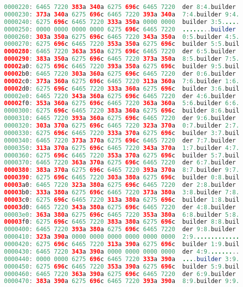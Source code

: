 \begin{lstlisting}[language=Java]
0000220: 6465 7220 383a 340a 6275 696c 6465 7220  der 8:4.builder
0000230: 373a 340a 6275 696c 6465 7220 393a 340a  7:4.builder 9:4.
0000240: 6275 696c 6465 7220 333a 350a 0000 0000  builder 3:5.....
0000250: 0000 0000 0000 0000 6275 696c 6465 7220  ........builder
0000260: 303a 350a 6275 696c 6465 7220 343a 350a  0:5.builder 4:5.
0000270: 6275 696c 6465 7220 353a 350a 6275 696c  builder 5:5.buil
0000280: 6465 7220 363a 350a 6275 696c 6465 7220  der 6:5.builder
0000290: 383a 350a 6275 696c 6465 7220 373a 350a  8:5.builder 7:5.
00002a0: 6275 696c 6465 7220 393a 350a 6275 696c  builder 9:5.buil
00002b0: 6465 7220 303a 360a 6275 696c 6465 7220  der 0:6.builder
00002c0: 373a 360a 6275 696c 6465 7220 313a 360a  7:6.builder 1:6.
00002d0: 6275 696c 6465 7220 333a 360a 6275 696c  builder 3:6.buil
00002e0: 6465 7220 343a 360a 6275 696c 6465 7220  der 4:6.builder
00002f0: 353a 360a 6275 696c 6465 7220 363a 360a  5:6.builder 6:6.
0000300: 6275 696c 6465 7220 383a 360a 6275 696c  builder 8:6.buil
0000310: 6465 7220 393a 360a 6275 696c 6465 7220  der 9:6.builder
0000320: 303a 370a 6275 696c 6465 7220 323a 370a  0:7.builder 2:7.
0000330: 6275 696c 6465 7220 333a 370a 6275 696c  builder 3:7.buil
0000340: 6465 7220 373a 370a 6275 696c 6465 7220  der 7:7.builder
0000350: 313a 370a 6275 696c 6465 7220 343a 370a  1:7.builder 4:7.
0000360: 6275 696c 6465 7220 353a 370a 6275 696c  builder 5:7.buil
0000370: 6465 7220 363a 370a 6275 696c 6465 7220  der 6:7.builder
0000380: 383a 370a 6275 696c 6465 7220 393a 370a  8:7.builder 9:7.
0000390: 6275 696c 6465 7220 303a 380a 6275 696c  builder 0:8.buil
00003a0: 6465 7220 323a 380a 6275 696c 6465 7220  der 2:8.builder
00003b0: 333a 380a 6275 696c 6465 7220 373a 380a  3:8.builder 7:8.
00003c0: 6275 696c 6465 7220 313a 380a 6275 696c  builder 1:8.buil
00003d0: 6465 7220 343a 380a 6275 696c 6465 7220  der 4:8.builder
00003e0: 363a 380a 6275 696c 6465 7220 353a 380a  6:8.builder 5:8.
00003f0: 6275 696c 6465 7220 383a 380a 6275 696c  builder 8:8.buil
0000400: 6465 7220 393a 380a 6275 696c 6465 7220  der 9:8.builder
0000410: 323a 390a 0000 0000 0000 0000 0000 0000  2:9.............
0000420: 6275 696c 6465 7220 313a 390a 6275 696c  builder 1:9.buil
0000430: 6465 7220 343a 390a 0000 0000 0000 0000  der 4:9.........
0000440: 0000 0000 6275 696c 6465 7220 333a 390a  ....builder 3:9.
0000450: 6275 696c 6465 7220 353a 390a 6275 696c  builder 5:9.buil
0000460: 6465 7220 363a 390a 6275 696c 6465 7220  der 6:9.builder
0000470: 383a 390a 6275 696c 6465 7220 393a 390a  8:9.builder 9:9.

\end{lstlisting}
